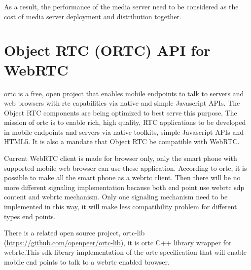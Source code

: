 \par As a result, the performance of the media server need to be considered as the cost of media server deployment and distribution together.

\section{Object RTC (ORTC) API for WebRTC}

\par \gls{ortc} is a free, open project that enables mobile endpoints to talk to servers and web browsers with \gls{rtc} capabilities via native and simple Javascript APIs. The Object RTC components are being optimized to best serve this purpose.\cite{website:ortc} The mission of \gls{ortc} is to enable rich, high quality, RTC applications to be developed in mobile endpoints and servers via native toolkits, simple Javascript APIs and HTML5. It is also a mandate that Object RTC be compatible with WebRTC.

\par Current WebRTC client is made for browser only, only the smart phone with supported mobile web browser can use these application. According to \gls{ortc}, it is possible to make all the smart phone as a \gls{webrtc} client. Then there will be no more different signaling implementation because both end point use \gls{webrtc} \gls{sdp} content and \gls{webrtc} mechanism. Only one signaling mechanism need to be implemented in this way, it will make less compatibility problem for different types end points.

\par There is a related open source project, ortc-lib (\url{https://github.com/openpeer/ortc-lib}), it is \gls{ortc} C++ library wrapper for \gls{webrtc}.This \gls{sdk} library implementation of the \gls{ortc} specification that will enable mobile end points to talk to a \gls{webrtc} enabled browser.

